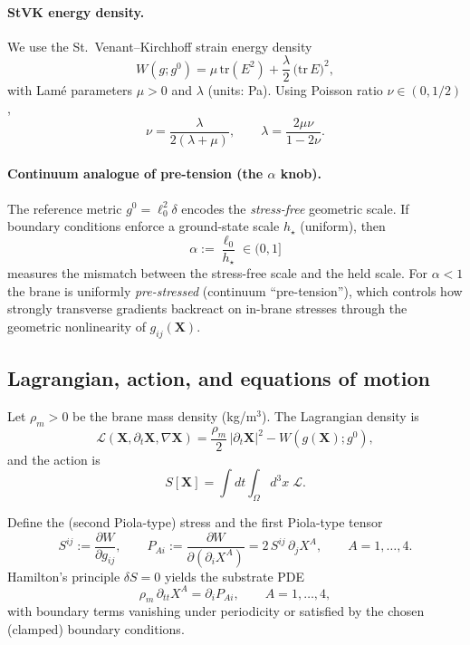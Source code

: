 \documentclass[11pt,a4paper]{article}
\newcommand{\X}{\mathbf{X}}                 %
\begin{document}
\paragraph{StVK energy density.}
We use the St.\ Venant--Kirchhoff strain energy density
\begin{equation}
W(g;g^0)=\mu\,\mathrm{tr}(E^2)+\frac{\lambda}{2}\,\big(\mathrm{tr}\,E\big)^2,
\label{eq:stvk_energy}
\end{equation}
with Lam\'e parameters \(\mu>0\) and \(\lambda\) (units: Pa). Using Poisson ratio \(\nu\in(0,1/2)\),
\[
\nu=\frac{\lambda}{2(\lambda+\mu)},
\qquad
\lambda=\frac{2\mu\nu}{1-2\nu}.
\]

\paragraph{Continuum analogue of pre-tension (the \(\alpha\) knob).}
The reference metric \(g^0=\ell_0^2\delta\) encodes the \emph{stress-free} geometric scale.
If boundary conditions enforce a ground-state scale \(h_\star\) (uniform), then
\[
\alpha:=\frac{\ell_0}{h_\star}\in(0,1]
\]
measures the mismatch between the stress-free scale and the held scale. For \(\alpha<1\) the brane is uniformly
\emph{pre-stressed} (continuum ``pre-tension''), which controls how strongly transverse gradients backreact
on in-brane stresses through the geometric nonlinearity of \(g_{ij}(\X)\).

\subsection{Lagrangian, action, and equations of motion}
Let $\rho_m>0$ be the brane mass density (kg/m$^3$). The Lagrangian density is
\begin{equation}
  \mathcal{L}(\mathbf{X},\partial_t\mathbf{X},\nabla\mathbf{X})
  =\frac{\rho_m}{2}\,|\partial_t\mathbf{X}|^2
  -W\!\left(g(\mathbf{X});g^0\right),
  \label{eq:lagrangian_density}
\end{equation}
and the action is
\begin{equation}
  S[\mathbf{X}] = \int dt \int_{\Omega} d^3x\;\mathcal{L}.
  \label{eq:action}
\end{equation}

Define the (second Piola-type) stress and the first Piola-type tensor
\begin{equation}
  S^{ij}:=\frac{\partial W}{\partial g_{ij}},
  \qquad
  P_{Ai}:=\frac{\partial W}{\partial(\partial_i X^A)}
         =2\,S^{ij}\,\partial_j X^A,
  \qquad A=1,\dots,4.
  \label{eq:piola_stress}
\end{equation}
Hamilton’s principle $\delta S=0$ yields the substrate PDE
\begin{equation}
  \rho_m\,\partial_{tt}X^A = \partial_i P_{Ai},
  \qquad A=1,\dots,4,
  \label{eq:continuous_eom}
\end{equation}
with boundary terms vanishing under periodicity or satisfied by the chosen
(clamped) boundary conditions.
\end{document}
